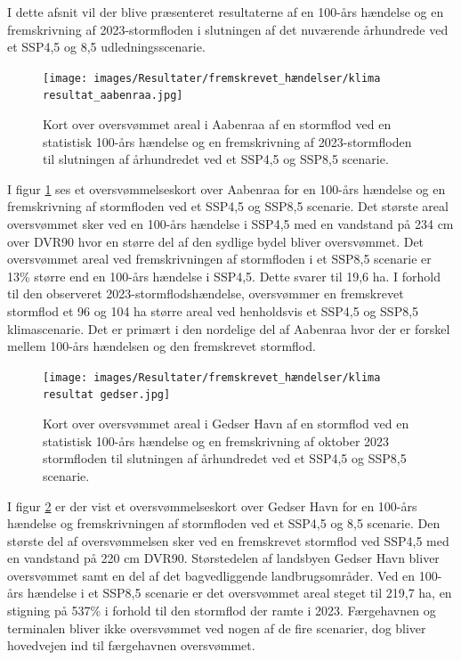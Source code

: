 I dette afsnit vil der blive præsenteret resultaterne af en 100-års hændelse og en fremskrivning af 2023-stormfloden i slutningen af det nuværende århundrede ved et SSP4,5 og 8,5 udledningsscenarie. 
\begin{figure}[H]
    \centering
    \texttt{[image: images/Resultater/fremskrevet\_hændelser/klima resultat\_aabenraa.jpg]}
    \caption{Kort over oversvømmet areal i Aabenraa af en stormflod ved en statistisk 100-års hændelse og en fremskrivning af 2023-stormfloden til slutningen af århundredet ved et SSP4,5 og SSP8,5 scenarie.}
    \label{Figur: Klima Aabenraa}
\end{figure}
I figur \ref{Figur: Klima Aabenraa} ses et oversvømmelseskort over Aabenraa for en 100-års hændelse og en fremskrivning af stormfloden ved et SSP4,5 og SSP8,5 scenarie. Det største areal oversvømmet sker ved en 100-års hændelse i SSP4,5 med en vandstand på 234 cm over DVR90 hvor en større del af den sydlige bydel bliver oversvømmet. Det oversvømmet areal ved fremskrivningen af stormfloden i et SSP8,5 scenarie er 13\% større end en 100-års hændelse i SSP4,5. Dette svarer til 19,6 ha. I forhold til den observeret 2023-stormflodshændelse, oversvømmer en fremskrevet stormflod et 96 og 104 ha større areal ved henholdsvis et SSP4,5 og SSP8,5 klimascenarie. Det er primært i den nordelige del af Aabenraa hvor der er forskel mellem 100-års hændelsen og den fremskrevet stormflod.  
\begin{figure}[H]
    \centering
    \texttt{[image: images/Resultater/fremskrevet\_hændelser/klima resultat gedser.jpg]}
    \caption{Kort over oversvømmet areal i Gedser Havn af en stormflod ved en statistisk 100-års hændelse og en fremskrivning af oktober 2023 stormfloden til slutningen af århundredet ved et SSP4,5 og SSP8,5 scenarie.}
    \label{Figur: Klima Gedser Havn}
\end{figure}
I figur \ref{Figur: Klima Gedser Havn} er der vist et oversvømmelseskort over Gedser Havn for en 100-års hændelse og fremskrivningen af stormfloden ved et SSP4,5 og 8,5 scenarie. Den største del af oversvømmelsen sker ved en fremskrevet stormflod ved SSP4,5 med en vandstand på 220 cm DVR90. Størstedelen af landsbyen Gedser Havn bliver oversvømmet samt en del af det bagvedliggende landbrugsområder. Ved en 100-års hændelse i et SSP8,5 scenarie er det oversvømmet areal steget til 219,7 ha, en stigning på 537\% i forhold til den stormflod der ramte i 2023. Færgehavnen og terminalen bliver ikke oversvømmet ved nogen af de fire scenarier, dog bliver hovedvejen ind til færgehavnen oversvømmet.
